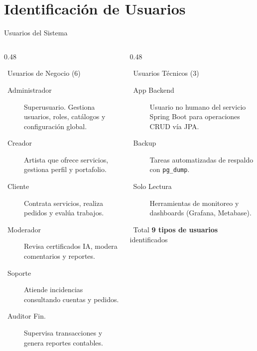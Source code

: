 \documentclass[aspectratio=169]{beamer}
\begin{document}
\section{Identificación de Usuarios}

\begin{frame}{Usuarios del Sistema}
    \begin{columns}[T]
        \begin{column}{0.48\textwidth}
            \begin{block}{\faUsers\ Usuarios de Negocio (6)}
                \scriptsize
                \begin{description}
                    \item[\faUserCog\ Administrador] Superusuario. Gestiona usuarios, roles, catálogos y configuración global.
                    \item[\faPaintBrush\ Creador] Artista que ofrece servicios, gestiona perfil y portafolio.
                    \item[\faShoppingCart\ Cliente] Contrata servicios, realiza pedidos y evalúa trabajos.
                    \item[\faEye\ Moderador] Revisa certificados IA, modera comentarios y reportes.
                    \item[\faHeadset\ Soporte] Atiende incidencias consultando cuentas y pedidos.
                    \item[\faChartLine\ Auditor Fin.] Supervisa transacciones y genera reportes contables.
                \end{description}
            \end{block}
        \end{column}
        \begin{column}{0.48\textwidth}
            \begin{block}{\faRobot\ Usuarios Técnicos (3)}
                \scriptsize
                \begin{description}
                    \item[\faServer\ App Backend] Usuario no humano del servicio Spring Boot para operaciones CRUD vía JPA.
                    \item[\faHdd\ Backup] Tareas automatizadas de respaldo con \texttt{pg\_dump}.
                    \item[\faChartBar\ Solo Lectura] Herramientas de monitoreo y dashboards (Grafana, Metabase).
                \end{description}
            \end{block}
            \vspace{0.2cm}
            \begin{alertblock}{\faExclamationTriangle\ Total}
                \centering \textbf{9 tipos de usuarios} identificados
            \end{alertblock}
        \end{column}
    \end{columns}
\end{frame}
\end{document}
